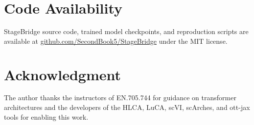 \documentclass[conference]{IEEEtran}
\begin{document}
\section{Code Availability}

StageBridge source code, trained model checkpoints, and reproduction scripts are available at \href{https://github.com/SecondBook5/StageBridge}{github.com/SecondBook5/StageBridge} under the MIT license.

\section*{Acknowledgment}

The author thanks the instructors of EN.705.744 for guidance on transformer architectures and the developers of the HLCA, LuCA, scVI, scArches, and ott-jax tools for enabling this work.



\end{document}
